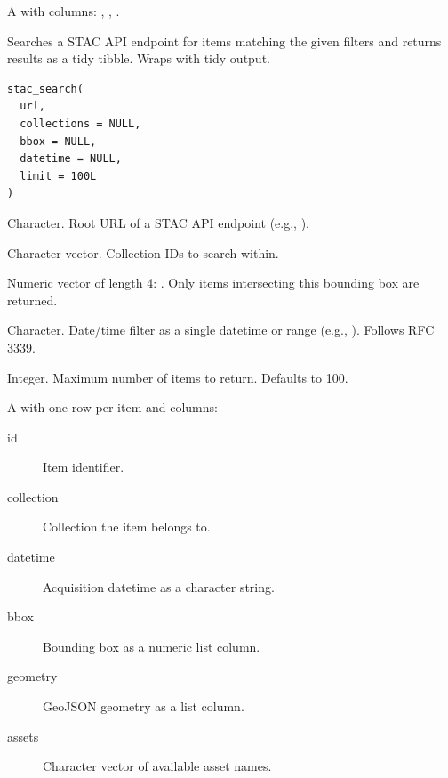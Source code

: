 \documentclass[a4paper]{book}
\begin{document}
%
\begin{Value}
A  with columns: , , .
\end{Value}
%
\begin{Description}
Searches a STAC API endpoint for items matching the given filters and
returns results as a tidy tibble. Wraps  with
tidy output.
\end{Description}
%
\begin{Usage}
\begin{verbatim}
stac_search(
  url,
  collections = NULL,
  bbox = NULL,
  datetime = NULL,
  limit = 100L
)
\end{verbatim}
\end{Usage}
%
\begin{Arguments}
\begin{ldescription}
\item[\code{url}] Character. Root URL of a STAC API endpoint
(e.g., ).

\item[\code{collections}] Character vector. Collection IDs to search within.

\item[\code{bbox}] Numeric vector of length 4: .
Only items intersecting this bounding box are returned.

\item[\code{datetime}] Character. Date/time filter as a single datetime or
range (e.g., ). Follows RFC 3339.

\item[\code{limit}] Integer. Maximum number of items to return. Defaults to 100.
\end{ldescription}
\end{Arguments}
%
\begin{Value}
A  with one row per item and columns:
\begin{description}

\item[id] Item identifier.
\item[collection] Collection the item belongs to.
\item[datetime] Acquisition datetime as a character string.
\item[bbox] Bounding box as a numeric list column.
\item[geometry] GeoJSON geometry as a list column.
\item[assets] Character vector of available asset names.

\end{description}

\end{Value}
\end{document}
